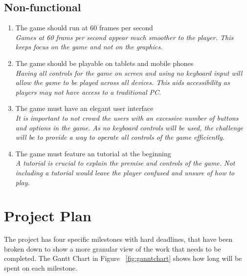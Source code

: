 \documentclass[12pt,a4paper]{report}
\begin{document}
   \section{Non-functional}
   \begin{enumerate}[label*=\thesection.\arabic*]
            \item The game should run at 60 frames per second\\
            \textit{Games at 60 frams per second appear much smoother to the player. This keeps focus on the game and not on the graphics.}
            \item The game should be playable on tablets and mobile phones\\
            \textit{Having all controls for the game on screen and using no keyboard input will allow the game to be played across all devices. This aids accessibility as players may not have access to a traditional PC.}
            \item The game must have an elegant user interface\\
            \textit{It is important to not crowd the users with an excessive number of buttons and options in the game. As no keyboard controls will be used, the challenge will be to provide a way to operate all controls of the game efficiently.}
             \item The game must feature an tutorial at the beginning\\
            \textit{A tutorial is crucial to explain the premise and controls of the game. Not including a tutorial would leave the player confused and unsure of how to play. }
        \end{enumerate}



{\let\clearpage\relax\chapter{Project Plan}}
\noindent 
The project has four specific milestones with hard deadlines, that have been broken down to show a more granular view of the work that needs to be completed. The Gantt Chart in Figure ~\ref{fig:ganntchart} shows how long will be spent on each milestone.
\end{document}
